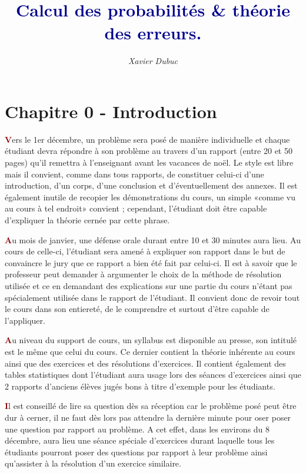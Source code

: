\documentclass{article}
\title{\textbf{\textcolor{darkblue}{Calcul des probabilités \& théorie des erreurs.}}}
\author{\textit{Xavier Dubuc}}
\begin{document}
\maketitle

\hbox{}

\tableofcontents %

\hbox{}

\section*{Chapitre 0 - Introduction}

\textbf{\textcolor{darkred}{V}}ers le 1er décembre, un problème sera posé de manière individuelle et chaque étudiant devra répondre à son problème au 
travers d'un rapport (entre 20 et 50 pages) qu'il remettra à l'enseignant avant les vacances de noël. Le style est libre
mais il convient, comme dans tous rapports, de constituer celui-ci d'une introduction, d'un corps, d'une conclusion et
d'éventuellement des annexes. Il est également inutile de recopier les démonstrations du cours, un simple «comme vu au cours
à tel endroit» convient ; cependant, l'étudiant doit être capable d'expliquer la théorie cernée par cette phrase.

\textbf{\textcolor{darkred}{A}}u mois de janvier, une défense orale durant entre 10 et 30 minutes aura lieu. Au cours de celle-ci, l'étudiant sera amené à
expliquer son rapport dans le but de convaincre le jury que ce rapport a bien été fait par celui-ci. Il est à savoir que le
professeur peut demander à argumenter le choix de la méthode de résolution utilisée et ce en demandant des explications sur
une partie du cours n'étant pas spécialement utilisée dans le rapport de l'étudiant. Il convient donc de revoir tout le
cours dans son entiereté, de le comprendre et surtout d'être capable de l'appliquer.

\textbf{\textcolor{darkred}{A}}u niveau du support de cours, un syllabus est disponible au presse, son intitulé est le même que celui du cours.
Ce dernier contient la théorie inhérente au cours ainsi que des exercices et des résolutions d'exercices. Il contient
également des tables statistiques dont l'étudiant aura usage lors des séances d'exercices ainsi que 2 rapports d'anciens
élèves jugés bons à titre d'exemple pour les étudiants.

\textbf{\textcolor{darkred}{I}}l est conseillé de lire sa question dès sa réception car le problème posé peut être dur à cerner, il ne faut dès lors pas
attendre la dernière minute pour oser poser une question par rapport au problème. A cet effet, dans les environs du 8 
décembre, aura lieu une séance spéciale d'exercices durant laquelle tous les étudiants pourront poser des questions par
rapport à leur problème ainsi qu'assister à la résolution d'un exercice similaire.
\end{document}
